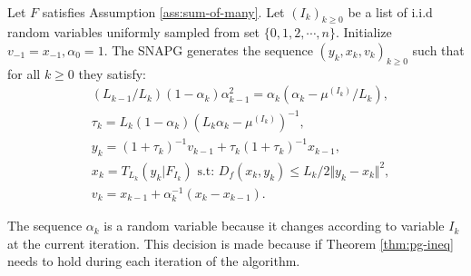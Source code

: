 \documentclass[12pt]{article}
\begin{document}
        \begin{definition}\;\label{def:snapg-v1}\\
            Let $F$ satisfies Assumption \ref{ass:sum-of-many}. 
            Let $(I_k)_{k \ge 0}$ be a list of i.i.d random variables uniformly sampled from set $\{0, 1, 2, \cdots, n\}$. 
            Initialize $v_{-1} = x_{-1}, \alpha_0 = 1$. 
            The SNAPG generates the sequence $(y_k, x_k, v_k)_{k \ge 0}$ such that for all $k \ge 0$ they satisfy: 
            \begin{align*}
                & (L_{k - 1}/L_k)(1 - \alpha_{k})\alpha_{k - 1}^2 = \alpha_{k}\left(\alpha_{k} - \mu^{(I_k)}/L_k\right), \\
                & \tau_k = L_k(1 - \alpha_k)\left(L_k \alpha_k - \mu^{(I_k)}\right)^{-1}, \\
                & y_k = (1 + \tau_k)^{-1}v_{k - 1} + \tau_k(1 + \tau_k)^{-1}x_{k - 1}, \\
                & x_k =  T_{L_k}(y_k | F_{I_k}) \text{ s.t: } D_f(x_k, y_k) \le L_k/2\Vert y_k - x_k\Vert^2, \\
                & v_k = x_{k - 1} + \alpha_k^{-1}(x_k - x_{k - 1}). 
            \end{align*}
        \end{definition}
        \begin{remark}
            The sequence $\alpha_k$ is a random variable because it changes according to variable $I_k$ at the current iteration.
            This decision is made because if Theorem \ref{thm:pg-ineq} needs to hold during each iteration of the algorithm.
        \end{remark}
\end{document}

